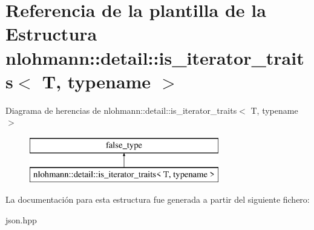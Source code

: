 \hypertarget{structnlohmann_1_1detail_1_1is__iterator__traits}{}\section{Referencia de la plantilla de la Estructura nlohmann\+:\+:detail\+:\+:is\+\_\+iterator\+\_\+traits$<$ T, typename $>$}
\label{structnlohmann_1_1detail_1_1is__iterator__traits}
Diagrama de herencias de nlohmann\+:\+:detail\+:\+:is\+\_\+iterator\+\_\+traits$<$ T, typename $>$\begin{figure}[H]
\begin{center}
\leavevmode
\includegraphics[height=2.000000cm]{structnlohmann_1_1detail_1_1is__iterator__traits}
\end{center}
\end{figure}


La documentación para esta estructura fue generada a partir del siguiente fichero\+:\begin{DoxyCompactItemize}
\item 
json.\+hpp\end{DoxyCompactItemize}
